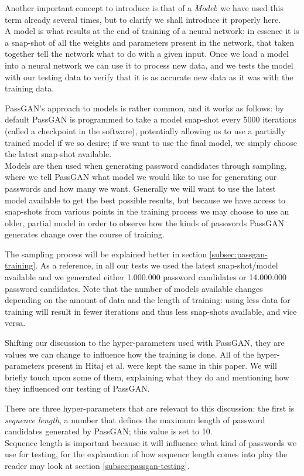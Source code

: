 Another important concept to introduce is that of a \emph{Model}: we have used this term already several times, but to clarify we shall introduce it properly here.\\
A model is what results at the end of training of a neural network: in essence it is a snap-shot of all the weights and parameters present in the network, that taken together tell the network what to do with a given input. Once we load a model into a neural network we can use it to process new data, and we tests the model with our testing data to verify that it is as accurate new data as it was with the training data.

PassGAN's approach to models is rather common, and it works as follows: by default PassGAN is programmed to take a model snap-shot every 5000 iterations (called a checkpoint in the software), potentially allowing us to use a partially trained model if we so desire; if we want to use the final model, we simply choose the latest snap-shot available.\\
Models are then used when generating password candidates through sampling, where we tell PassGAN what model we would like to use for generating our passwords and how many we want. Generally we will want to use the latest model available to get the best possible results, but because we have access to snap-shots from various points in the training process we may choose to use an older, partial model in order to observe how the kinds of passwords PassGAN generates change over the course of training.

The sampling process will be explained better in section \ref{subsec:passgan-training}. As a reference, in all our tests we used the latest snap-shot/model available and we generated either 1.000.000 password candidates or 14.000.000 password candidates.
Note that the number of models available changes depending on the amount of data and the length of training: using less data for training will result in fewer iterations and thus less snap-shots available, and vice versa.

Shifting our discussion to the hyper-parameters used with PassGAN, they are values we can change to influence how the training is done. All of the hyper-parameters present in Hitaj et al. \cite{PassGAN} were kept the same in this paper. We will briefly touch upon some of them, explaining what they do and mentioning how they influenced our testing of PassGAN.

There are three hyper-parameters that are relevant to this discussion: the first is \emph{sequence length}, a number that defines the maximum length of password candidates generated by PassGAN; this value is set to 10.\\ 
Sequence length is important because it will influence what kind of passwords we use for testing, for the explanation of how sequence length comes into play the reader may look at section \ref{subsec:passgan-testing}.

